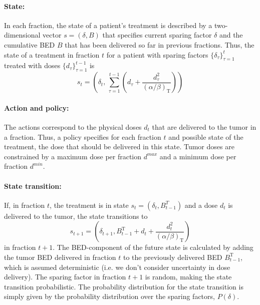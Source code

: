 \documentclass[\relativeRoot/ada.tex]{subfiles}
\begin{document}
\paragraph{State:} In each fraction, the state of a patient's treatment is described by a two-dimensional vector $s=(\delta , B)$ that specifies current sparing factor $\delta$ and the cumulative BED $B$ that has been delivered so far in previous fractions. Thus, the state of a treatment in fraction $t$ for a patient with sparing factors $\{\delta_\tau\}_{\tau=1}^{t}$ treated with doses $\{d_\tau\}_{\tau=1}^{t-1}$ is
\begin{equation*}
    s_t = \left(\delta_t, \, \sum_{\tau=1}^{t-1}(d_\tau+\frac{d_\tau^2}{({\alpha}/{\beta})_\text{T}}) \right)
\end{equation*}

\paragraph{Action and policy:} The actions correspond to the physical doses $d_t$ that are delivered to the tumor in a fraction. Thus, a policy specifies for each fraction $t$ and possible state of the treatment, the dose that should be delivered in this state. Tumor doses are constrained by a maximum dose per fraction $d^{max}$ and a minimum dose per fraction $d^{min}$.

\paragraph{State transition:} If, in fraction $t$, the treatment is in state $s_t = (\delta_t, B^T_{t-1})$ and a dose $d_t$ is delivered to the tumor, the state transitions to
\begin{equation*}
    s_{t+1} = \left(\delta_{t+1}, B^\text{T}_{t-1} + d_t+\frac{d_t^2}{(\alpha / \beta)_\text{T}} \right)
\end{equation*}
in fraction $t+1$. The BED-component of the future state is calculated by adding the tumor BED delivered in fraction $t$ to the previously delivered BED $B^{\text{T}}_{t-1}$, which is assumed deterministic (i.e. we don't consider uncertainty in dose delivery). The sparing factor in fraction $t+1$ is random, making the state transition probabilistic. The probability distribution for the state transition is simply given by the probability distribution over the sparing factors, $P(\delta)$.
\end{document}
